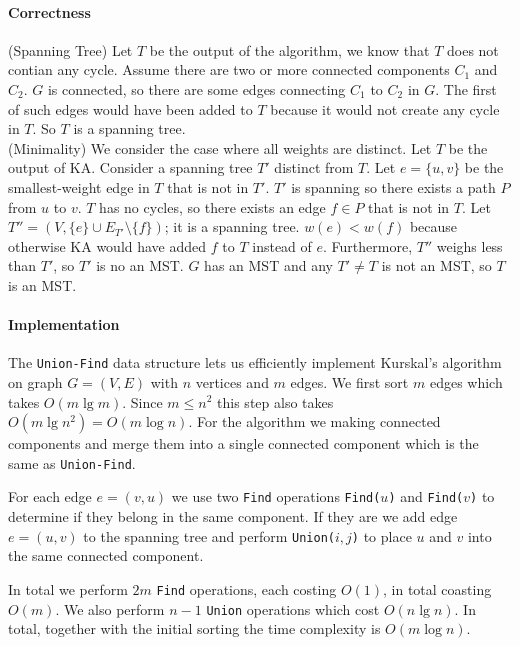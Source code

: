 \paragraph{Correctness} 
(Spanning Tree) 
Let \(T\) be the output of the algorithm, we know that \(T\) does not contian any cycle.
Assume there are two or more connected components \(C_1\) and \(C_2\). \(G\) is connected,
so there are some edges connecting \(C_1\) to \(C_2\) in \(G\). The first of such edges would 
have been added to \(T\) because it would not create any cycle in \(T\). So \(T\) is a spanning
tree. \\[0.2cm]
(Minimality)
We consider the case where all weights are distinct. Let \(T\) be the output of KA.
Consider a spanning tree \(T'\) distinct from \(T\). Let \(e = \{u, v\}\) be the smallest-weight
edge in \(T\) that is not in \(T'\). \(T'\) is spanning so there exists a path \(P\) from
\(u\) to \(v\). \(T\) has no cycles, so there exists an edge \(f \in P\) that is not in \(T\).
Let \(T''=(V, \{e\} \cup E_{T'} \setminus \{f\})\); it is a spanning tree. \(w(e) < w(f)\) because
otherwise KA would have added \(f\) to \(T\) instead of \(e\). Furthermore, \(T''\) weighs
less than \(T'\), so \(T'\) is no an MST. \(G\) has an MST and any \(T' \neq T\) is not an
MST, so \(T\) is an MST.

\paragraph{Implementation}
The \texttt{Union-Find} data structure lets us efficiently implement Kurskal's algorithm
on graph \(G = (V, E)\) with \(n\) vertices and \(m\) edges. We first sort \(m\) edges
which takes \(O(m \lg m)\). Since \(m \leq n^2\) this step also takes \(O(m \lg n^2) = O(m\log n)\).
For the algorithm we making connected components and merge them into a single connected 
component which is the same as \texttt{Union-Find}.

For each edge \(e = (v, u)\) we use two \texttt{Find} operations \texttt{Find(\(u\))} and
\texttt{Find(\(v\))} to determine if they belong in the same component. If they are
we add edge \(e = (u, v)\) to the spanning tree and perform \texttt{Union(\(i,j\))} to 
place \(u\) and \(v\) into the same connected component.

In total we perform \(2m\) \texttt{Find} operations, each costing \(O(1)\), in total coasting 
\(O(m)\). We also perform \(n-1\) \texttt{Union} operations which cost \(O(n \lg n)\).
In total, together with the initial sorting the time complexity is \(O(m \log n)\).
